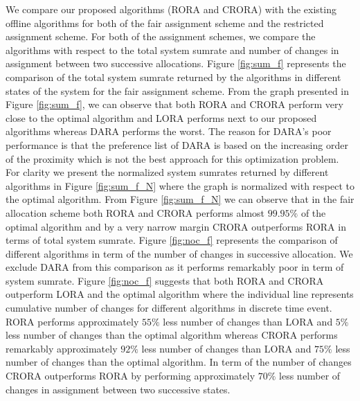 \documentclass[times]{dacauth}
\begin{document}




\noindent
We compare our proposed algorithms (RORA and CRORA) with the existing offline algorithms for both of the fair assignment scheme and the restricted assignment scheme. For both of the assignment schemes, we compare the algorithms with respect to the total system sumrate and number of changes in assignment between two successive allocations. Figure \ref{fig:sum_f} represents the comparison of the total system sumrate returned by the algorithms in different states of the system for the fair assignment scheme. From the graph presented in Figure \ref{fig:sum_f}, we can observe that both RORA and CRORA perform very close to the optimal algorithm and LORA performs next to our proposed algorithms whereas DARA performs the worst. The reason for DARA's poor performance is that the preference list of DARA is based on the increasing order of the proximity which is not the best approach for this optimization problem. For clarity we present the normalized system sumrates returned by different algorithms in Figure \ref{fig:sum_f_N} where the graph is normalized with respect to the optimal algorithm. From Figure \ref{fig:sum_f_N} we can observe that in the fair allocation scheme both RORA and CRORA performs almost $99.95\%$ of the optimal algorithm and by a very narrow margin CRORA outperforms RORA  in terms of total system sumrate. Figure  \ref{fig:noc_f} represents the comparison of different algorithms in term of the number of changes in successive allocation. We exclude DARA from this comparison as it performs remarkably poor in term of system sumrate. Figure \ref{fig:noc_f} suggests that both RORA and CRORA outperform LORA and the optimal algorithm where the individual line represents cumulative number of changes for different algorithms in discrete time event. RORA performs approximately $55\%$ less number of changes than LORA and $5\%$ less number of changes than the optimal algorithm whereas CRORA performs remarkably approximately $92\%$ less number of changes than LORA and $75\%$ less number of changes than the optimal algorithm. In term of the number of changes CRORA outperforms RORA by performing approximately $70\%$ less number of changes in assignment between two successive states. 
\end{document}
